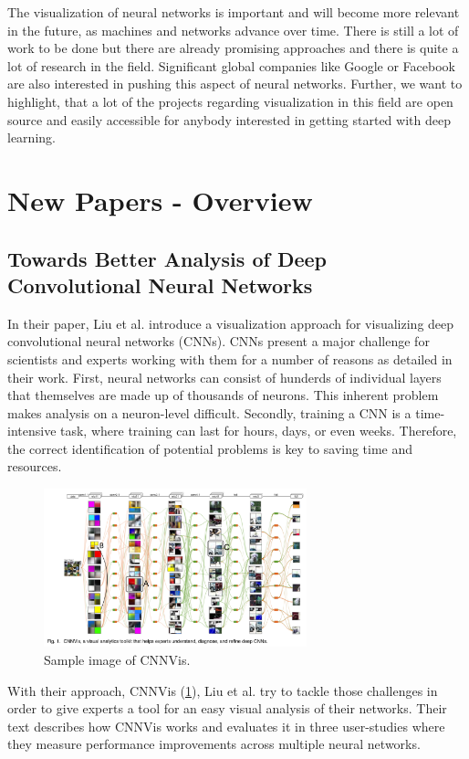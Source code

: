 \documentclass{acmsiggraph}               %
\begin{document}
The visualization of neural networks is important and will become more relevant in the future, as machines and networks advance over time. There is still a lot of work to be done but there are already promising approaches and there is quite a lot of research in the field. Significant global companies like Google or Facebook are also interested in pushing this aspect of neural networks. Further, we want to highlight, that a lot of the projects regarding visualization in this field are open source and easily accessible for anybody interested in getting started with deep learning. 

\newpage

\section{New Papers - Overview}
\subsection{Towards Better Analysis of Deep Convolutional Neural Networks}
In their paper, Liu et al. introduce a  visualization approach for visualizing deep convolutional neural networks (CNNs). CNNs present a major challenge for scientists and experts working with them for a number of reasons as detailed in their work. First, neural networks can consist of hunderds of individual layers that themselves are made up of thousands of neurons. This inherent problem makes analysis on a neuron-level difficult. Secondly, training a CNN is a time-intensive task, where training can last for hours, days, or even weeks. Therefore, the correct identification of potential problems is key to saving time and resources.\\

\begin{figure}
  \centering
  \includegraphics[width=3in]{cnnvis}
  \caption{Sample image of CNNVis. \protect\cite{}}
  \label{fig:cnnvis}
\end{figure}

With their approach, CNNVis (\ref{fig:cnnvis}), Liu et al. try to tackle those challenges in order to give experts a tool for an easy visual analysis of their networks. Their text describes how CNNVis works and evaluates it in three user-studies where they measure performance improvements across multiple neural networks.\\
\end{document}
